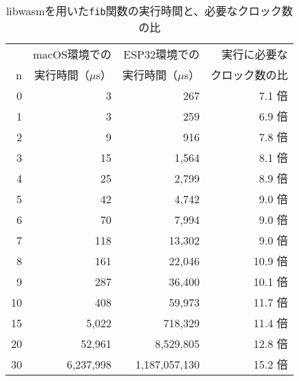 \begin{table}[htbp]
  \caption{libwasmを用いた{\tt fib}関数の実行時間と、必要なクロック数の比}
  \label{tab:fib_time}
  \begin{center}
    \begin{tabular}{rrrr}
      \hline
         & macOS環境での & ESP32環境での & 実行に必要な \\
       n & 実行時間（$\mu$s） & 実行時間（$\mu$s） & クロック数の比 \\ \hline \hline
       0 &         3 &           267 &  7.1 倍 \\ \hline
       1 &         3 &           259 &  6.9 倍 \\ \hline
       2 &         9 &           916 &  7.8 倍 \\ \hline
       3 &        15 &         1,564 &  8.1 倍 \\ \hline
       4 &        25 &         2,799 &  8.9 倍 \\ \hline
       5 &        42 &         4,742 &  9.0 倍 \\ \hline
       6 &        70 &         7,994 &  9.0 倍 \\ \hline
       7 &       118 &        13,302 &  9.0 倍 \\ \hline
       8 &       161 &        22,046 & 10.9 倍 \\ \hline
       9 &       287 &        36,400 & 10.1 倍 \\ \hline
      10 &       408 &        59,973 & 11.7 倍 \\ \hline
      15 &     5,022 &       718,329 & 11.4 倍 \\ \hline
      20 &    52,961 &     8,529,805 & 12.8 倍 \\ \hline
      30 & 6,237,998 & 1,187,057,130 & 15.2 倍 \\ \hline
    \end{tabular}
  \end{center}
\end{table}

